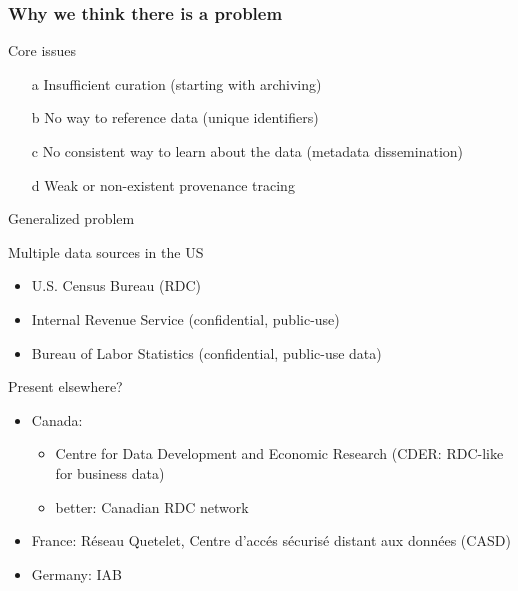 \begin{frame}
\frametitle{Why we think there is a problem}
\begin{block}{Core issues}
\begin{itemize}
\item[a] Insufficient curation (starting with archiving)
\item[b] No way to reference data (unique identifiers)
\item[c] No consistent way to learn about the data (metadata dissemination)
\item[d] Weak or non-existent provenance tracing
\end{itemize}
\end{block}
\end{frame}

\begin{frame}{Generalized problem}
\begin{block}{Multiple data sources in the US}
\begin{itemize}
\item U.S. Census Bureau (RDC) \hyperlink{Census}{}
\item Internal Revenue Service (confidential, public-use)\hyperlink{IRS}{}
\item Bureau of Labor Statistics (confidential, public-use data)\hyperlink{BLS}{}

\end{itemize}
\end{block}
\begin{block}{Present elsewhere?}
\begin{itemize}
\item Canada: 
\begin{itemize}
\item Centre for Data Development and Economic Research (CDER: RDC-like for business data)\hyperlink{CDER}{}
\item better: Canadian RDC network\hyperlink{CRDC}{}
\end{itemize}
\item France:  R\'eseau Quetelet\hyperlink{France}{}, Centre 
d'acc\'es s\'ecuris\'e distant aux donn\'ees (CASD) 
\item Germany: IAB
\end{itemize}
\end{block}
\end{frame}


